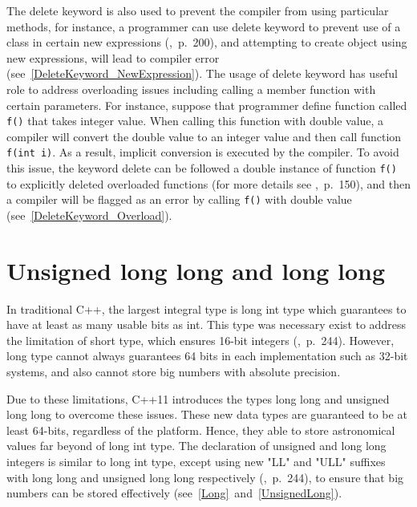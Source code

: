 \documentclass[11pt]{report}
\begin{document}
The delete keyword is also used to prevent the compiler from using particular methods, for instance, a programmer can use delete keyword to prevent use of a class in certain new expressions (\cite{ISO:2011:Cpplanguage},~p.~200), and attempting to create object using new expressions, will lead to compiler error (see~\ref{DeleteKeyword_NewExpression}). The usage of delete keyword has useful role to address overloading issues including calling a member function with certain parameters.  For instance, suppose that programmer define function called \texttt{f()} that takes integer value. When calling this function with double value, a compiler will convert the double value to an integer value and then call function \texttt{f(int i)}. As a result, implicit conversion is executed by the compiler. To avoid this issue, the keyword delete can be followed a double instance of function \texttt{f()} to explicitly deleted overloaded functions (for more details see \cite{Gregorie:professionalcpp},~p.~150), and then a compiler will be flagged as an error by calling \texttt{f()} with double value (see~\ref{DeleteKeyword_Overload}).

\section{Unsigned long long and long long}
\label{section: Unsigned and long long (int)}
In traditional C++, the largest integral type is long int type which guarantees to have at least as many usable bits as int. This type was necessary exist to address the limitation of short type, which ensures 16-bit integers (\cite{Overland:2011:CWF},~p.~244). However, long type cannot always guarantees 64 bits in each implementation such as 32-bit systems, and also cannot store big numbers with absolute precision.

Due to these limitations, C++11 introduces the types long long and unsigned long long to overcome these issues. These new data types are guaranteed to be at least 64-bits, regardless of the platform. Hence, they able to store astronomical values far beyond of long int type. The declaration of unsigned and long long integers is similar to long int type, except using new "LL" and "ULL" suffixes with long long and unsigned long long respectively (\cite{Overland:2011:CWF},~p.~244), to ensure that big numbers can be stored effectively (see~\ref{Long}~and~\ref{UnsignedLong}).

\end{document}
